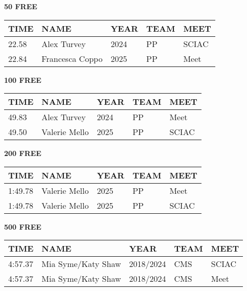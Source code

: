 \begin{minipage}[t]{0.48\textwidth}
\centering
\textbf{50 FREE}\\[0.05cm]
\begin{tabular}{@{}p{1.8cm}p{2.8cm}p{1.2cm}p{1.4cm}p{1.4cm}@{}}
\hline
\textbf{TIME} & \textbf{NAME} & \textbf{YEAR} & \textbf{TEAM} & \textbf{MEET} \\
\hline
22.58 & Alex Turvey & 2024 & PP & SCIAC \\
22.84 & Francesca Coppo & 2025 & PP & Meet \\
\hline
\end{tabular}
\end{minipage}\hfill
\begin{minipage}[t]{0.48\textwidth}
\centering
\textbf{100 FREE}\\[0.05cm]
\begin{tabular}{@{}p{1.8cm}p{2.8cm}p{1.2cm}p{1.4cm}p{1.4cm}@{}}
\hline
\textbf{TIME} & \textbf{NAME} & \textbf{YEAR} & \textbf{TEAM} & \textbf{MEET} \\
\hline
49.83 & Alex Turvey & 2024 & PP & Meet \\
49.50 & Valerie Mello & 2025 & PP & SCIAC \\
\hline
\end{tabular}
\end{minipage}

\vspace{0.4cm}

\begin{minipage}[t]{0.48\textwidth}
\centering
\textbf{200 FREE}\\[0.05cm]
\begin{tabular}{@{}p{1.8cm}p{2.8cm}p{1.2cm}p{1.4cm}p{1.4cm}@{}}
\hline
\textbf{TIME} & \textbf{NAME} & \textbf{YEAR} & \textbf{TEAM} & \textbf{MEET} \\
\hline
1:49.78 & Valerie Mello & 2025 & PP & Meet \\
1:49.78 & Valerie Mello & 2025 & PP & SCIAC \\
\hline
\end{tabular}
\end{minipage}\hfill
\begin{minipage}[t]{0.48\textwidth}
\centering
\textbf{500 FREE}\\[0.05cm]
\begin{tabular}{@{}p{1.8cm}p{2.8cm}p{1.2cm}p{1.4cm}p{1.4cm}@{}}
\hline
\textbf{TIME} & \textbf{NAME} & \textbf{YEAR} & \textbf{TEAM} & \textbf{MEET} \\
\hline
4:57.37 & Mia Syme/Katy Shaw & 2018/2024 & CMS & SCIAC \\
4:57.37 & Mia Syme/Katy Shaw & 2018/2024 & CMS & Meet \\
\hline
\end{tabular}
\end{minipage}

